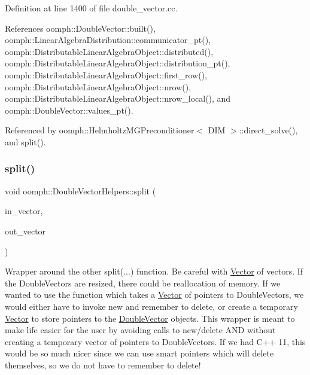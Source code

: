 Definition at line 1400 of file double\+\_\+vector.\+cc.



References oomph\+::\+Double\+Vector\+::built(), oomph\+::\+Linear\+Algebra\+Distribution\+::communicator\+\_\+pt(), oomph\+::\+Distributable\+Linear\+Algebra\+Object\+::distributed(), oomph\+::\+Distributable\+Linear\+Algebra\+Object\+::distribution\+\_\+pt(), oomph\+::\+Distributable\+Linear\+Algebra\+Object\+::first\+\_\+row(), oomph\+::\+Distributable\+Linear\+Algebra\+Object\+::nrow(), oomph\+::\+Distributable\+Linear\+Algebra\+Object\+::nrow\+\_\+local(), and oomph\+::\+Double\+Vector\+::values\+\_\+pt().



Referenced by oomph\+::\+Helmholtz\+M\+G\+Preconditioner$<$ D\+I\+M $>$\+::direct\+\_\+solve(), and split().

\mbox{\label{namespaceoomph_1_1DoubleVectorHelpers_a111654d0a7b7bfaae9cdd8101c8005ca}} 
\subsubsection{\texorpdfstring{split()}{split()}\hspace{0.1cm}{\footnotesize\ttfamily [2/2]}}
{\footnotesize\ttfamily void oomph\+::\+Double\+Vector\+Helpers\+::split (\begin{DoxyParamCaption}\item[{const \hyperlink{classoomph_1_1DoubleVector}{Double\+Vector} \&}]{in\+\_\+vector,  }\item[{\hyperlink{classoomph_1_1Vector}{Vector}$<$ \hyperlink{classoomph_1_1DoubleVector}{Double\+Vector} $>$ \&}]{out\+\_\+vector }\end{DoxyParamCaption})}



Wrapper around the other split(...) function. Be careful with \hyperlink{classoomph_1_1Vector}{Vector} of vectors. If the Double\+Vectors are resized, there could be reallocation of memory. If we wanted to use the function which takes a \hyperlink{classoomph_1_1Vector}{Vector} of pointers to Double\+Vectors, we would either have to invoke new and remember to delete, or create a temporary \hyperlink{classoomph_1_1Vector}{Vector} to store pointers to the \hyperlink{classoomph_1_1DoubleVector}{Double\+Vector} objects. This wrapper is meant to make life easier for the user by avoiding calls to new/delete A\+ND without creating a temporary vector of pointers to Double\+Vectors. If we had C++ 11, this would be so much nicer since we can use smart pointers which will delete themselves, so we do not have to remember to delete! 



